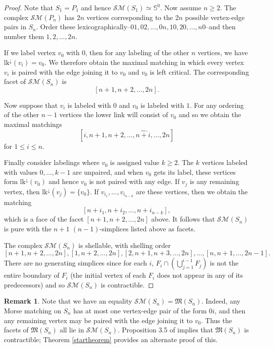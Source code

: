 \documentclass{amsart}
\theoremstyle{definition}
\newtheorem{remark}[theorem]{Remark}
\newcommand{\zs}{{\mathbb S}}
\newcommand{\sm}{{\mathcal{SM}}}
\begin{document}
\begin{proof}
    Note that $S_1=P_1$ and hence $\sm(S_1)\simeq \zs^0$. Now assume $n\ge 2$. The complex $\sm(P_n)$ has $2n$ vertices corresponding to the $2n$ possible vertex-edge pairs in $S_n$. Order these lexicographically--$01,02,\dots ,0n,10,20,\dots ,n0$--and then number them $1,2,\dots ,2n$.  
    
    If we label vertex $v_0$ with $0$, then for any labeling of the other $n$ vertices, we have $\textrm{lk}^\downarrow(v_i) = v_0$. We therefore obtain the maximal matching in which every vertex $v_i$ is paired with the edge joining it to $v_0$ and $v_0$ is left critical. The corresponding facet of $\sm(S_n)$ is $$[n+1,n+2,\dots ,2n].$$ 

    Now suppose that $v_i$ is labeled with $0$ and $v_0$ is labeled with $1$. For any ordering of the other $n-1$ vertices the lower link will consist of $v_0$ and so we obtain the maximal matchings $$[i,n+1,n+2,\dots ,\widehat{n+i},\dots ,2n]$$ for $1\le i\le n$.
    
    Finally consider labelings where $v_0$ is assigned value $k\ge 2$. The $k$ vertices labeled with values $0,\dots ,k-1$ are unpaired, and when $v_0$ gets its label, these vertices form $\textrm{lk}^\downarrow(v_0)$ and hence $v_0$ is not paired with any edge. If $v_j$ is any remaining vertex, then $\textrm{lk}^\downarrow(v_j) = \{v_0\}$. If $v_{i_1},\dots ,v_{i_{n-k}}$ are these vertices, then we obtain the matching $$[n+i_1,n+i_2,\dots ,n+{i_{n-k}}],$$ which is a face of the facet $[n+1,n+2,\dots ,2n]$ above. It follows that $\sm(S_n)$ is pure with the $n+1$ $(n-1)$-simplices listed above as facets.

    The complex $\sm(S_n)$ is shellable, with shelling order $$[n+1,n+2,\dots ,2n],[1,n+2,\dots ,2n],[2,n+1,n+3,\dots,2n],\dots ,[n,n+1,\dots ,2n-1].$$ There are no generating simplices since for each $i$, $F_i\cap (\bigcup_{j=1}^{i-1}F_j)$ is not the entire boundary of $F_i$ (the initial vertex of each $F_i$ does not appear in any of its predecessors) and so $\sm(S_n)$ is contractible.
\end{proof}

\begin{remark}
    Note that we have an equality $\sm(S_n)={\mathfrak M}(S_n)$. Indeed, any Morse matching on $S_n$ has at most one vertex-edge pair of the form $0i$, and then any remaining vertex may be paired with the edge joining it to $v_0$. Thus the facets of ${\mathfrak M}(S_n)$ all lie in $\sm(S_n)$. Proposition 3.5 of \cite{DonovonLinScoville2023} implies that ${\mathfrak M}(S_n)$ is contractible; Theorem \ref{startheorem} provides an alternate proof of this. 
\end{remark}
\end{document}
